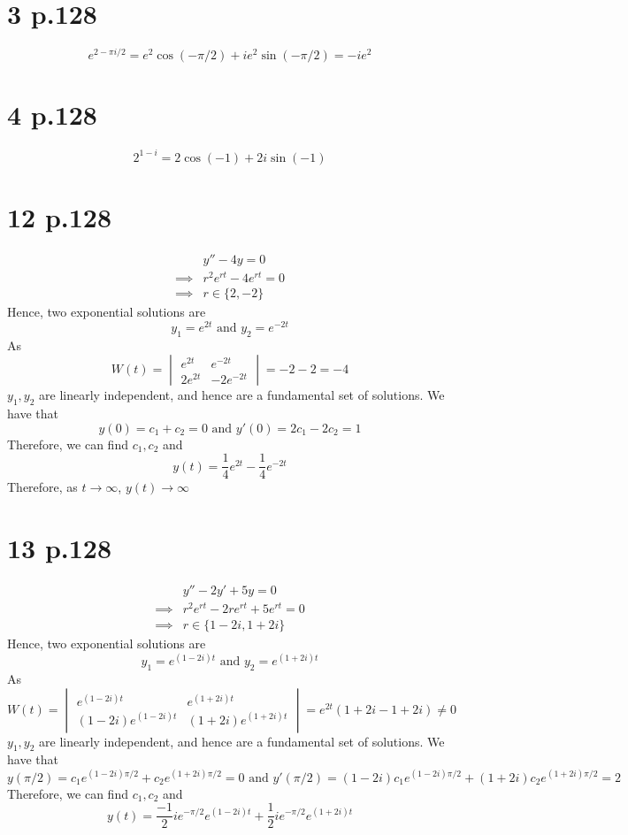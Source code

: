 \documentclass[11pt]{article}
\begin{document}
\section*{3 p.128}
\[
    e^{2-\pi i/2} = e^2 \cos(-\pi/2) + ie^2\sin(-\pi/2) = -ie^2
\]
\newpage
\section*{4 p.128}
\[
    2^{1-i} = 2 \cos(-1) + 2i\sin(-1)    
\]
\newpage
\section*{12 p.128}
\begin{equation*}
    \begin{aligned}
        &y'' - 4y = 0 \\
        \implies &r^2 e^{rt} - 4e^{rt} = 0 \\
        \implies &r \in \{2,-2\} 
    \end{aligned}
\end{equation*}
Hence, two exponential solutions are 
\[
    y_1 = e^{2t} \text{ and } y_2 = e^{-2t}    
\]
As 
\[ 
    W(t) = 
    \begin{vmatrix}
        e^{2t} & e^{-2t} \\
        2e^{2t} & -2e^{-2t} 
    \end{vmatrix}
    = -2-2 = -4
\]
$y_1,y_2$ are linearly independent, and hence are a fundamental set of solutions. We have that 
\[
    y(0) = c_1+ c_2 = 0 \text{ and } y'(0) = 2c_1 - 2c_2 = 1
\]
Therefore, we can find $c_1, c_2$ and 
\[
    y(t) = \frac{1}{4} e^{2t} - \frac{1}{4}e^{-2t}    
\]
Therefore, as $t \to \infty$, $y(t) \to \infty$
\newpage
\section*{13 p.128}
\begin{equation*}
    \begin{aligned}
        &y'' -2y' +5y = 0 \\
        \implies &r^2 e^{rt} - 2re^{rt} + 5e^{rt} = 0 \\
        \implies &r \in \{1-2i,1+2i\} 
    \end{aligned}
\end{equation*}
Hence, two exponential solutions are 
\[
    y_1 = e^{(1-2i)t} \text{ and } y_2 = e^{(1+2i)t}    
\]
As 
\[ 
    W(t) = 
    \begin{vmatrix}
        e^{(1-2i)t} & e^{(1+2i)t} \\
        (1-2i)e^{(1-2i)t} & (1+2i)e^{(1+2i)t} 
    \end{vmatrix}
    = e^{2t} (1+2i - 1+2i) \ne 0
\]
$y_1,y_2$ are linearly independent, and hence are a fundamental set of solutions. We have that 
\[
    y(\pi/2) = c_1e^{(1-2i)\pi/2} + c_2e^{(1+2i)\pi/2} = 0 \text{ and } y'(\pi/2) =(1-2i)c_1e^{(1-2i)\pi/2} + (1+2i)c_2e^{(1+2i)\pi/2} = 2
\]
Therefore, we can find $c_1, c_2$ and 
\[
    y(t) = \frac{-1}{2}ie^{-\pi/2} e^{(1-2i)t} + \frac{1}{2}ie^{-\pi/2}e^{(1+2i)t}
\]
\newpage
\end{document}
